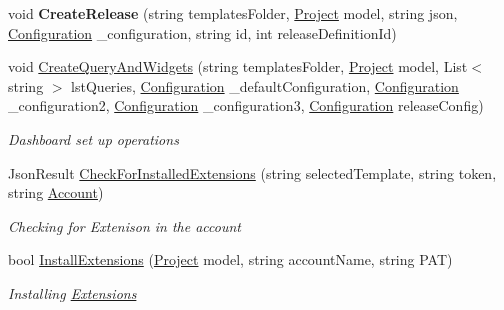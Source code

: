 \begin{DoxyCompactItemize}
\mbox{\label{class_vsts_demo_builder_1_1_controllers_1_1_environment_controller_affdad07d90ffee27284c3215d538d673}} 
void {\bfseries Create\+Release} (string templates\+Folder, \mbox{\hyperlink{class_vsts_demo_builder_1_1_models_1_1_project}{Project}} model, string json, \mbox{\hyperlink{class_vsts_demo_builder_1_1_models_1_1_configuration}{Configuration}} \+\_\+configuration, string id, int release\+Definition\+Id)
\item 
void \mbox{\hyperlink{class_vsts_demo_builder_1_1_controllers_1_1_environment_controller_ab1802a3d21c416002c2c7ff57019b6f8}{Create\+Query\+And\+Widgets}} (string templates\+Folder, \mbox{\hyperlink{class_vsts_demo_builder_1_1_models_1_1_project}{Project}} model, List$<$ string $>$ lst\+Queries, \mbox{\hyperlink{class_vsts_demo_builder_1_1_models_1_1_configuration}{Configuration}} \+\_\+default\+Configuration, \mbox{\hyperlink{class_vsts_demo_builder_1_1_models_1_1_configuration}{Configuration}} \+\_\+configuration2, \mbox{\hyperlink{class_vsts_demo_builder_1_1_models_1_1_configuration}{Configuration}} \+\_\+configuration3, \mbox{\hyperlink{class_vsts_demo_builder_1_1_models_1_1_configuration}{Configuration}} release\+Config)
\begin{DoxyCompactList}\small\item\em Dashboard set up operations \end{DoxyCompactList}\item 
Json\+Result \mbox{\hyperlink{class_vsts_demo_builder_1_1_controllers_1_1_environment_controller_a4ea213c905f5eb8d420e09d7a919a55d}{Check\+For\+Installed\+Extensions}} (string selected\+Template, string token, string \mbox{\hyperlink{class_vsts_rest_a_p_i_1_1_projects_and_teams_1_1_account}{Account}})
\begin{DoxyCompactList}\small\item\em Checking for Extenison in the account \end{DoxyCompactList}\item 
bool \mbox{\hyperlink{class_vsts_demo_builder_1_1_controllers_1_1_environment_controller_a8c6be4b2363680d958e6fdee4e74b91a}{Install\+Extensions}} (\mbox{\hyperlink{class_vsts_demo_builder_1_1_models_1_1_project}{Project}} model, string account\+Name, string P\+AT)
\begin{DoxyCompactList}\small\item\em Installing \mbox{\hyperlink{namespace_vsts_demo_builder_1_1_extensions}{Extensions}} \end{DoxyCompactList}\item 

\end{DoxyCompactItemize}
